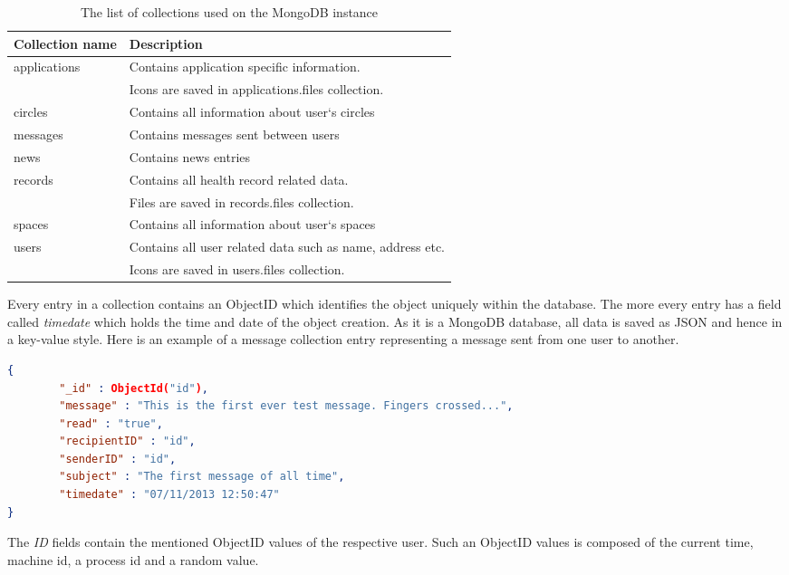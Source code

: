 \begin{table}[h]
  \centering
	\begin{tabular}{l l}
	Collection name & Description \\
	\hline
	applications & Contains application specific information. \\
	 & Icons are saved in applications.files collection.\\
	circles & Contains all information about user`s circles \\
	messages & Contains messages sent between users \\
	news & Contains news entries \\
	records & Contains all health record related data. \\
	 & Files are saved in records.files collection. \\
	spaces & Contains all information about user`s spaces \\
	users & Contains all user related data such as name, address etc. \\
	 & Icons are saved in users.files collection.\\
	\end{tabular}
	\caption{The list of collections used on the MongoDB instance}
  \label{tab:collectionTable}
\end{table}

Every entry in a collection contains an ObjectID which identifies the object uniquely within the database. The more every entry has a field called \emph{timedate} which holds the time and date of the object creation. As it is a MongoDB database, all data is saved as JSON and hence in a key-value style. Here is an example of a message collection entry representing a message sent from one user to another.\newline

\begin{lstlisting}[language=json,firstnumber=1]
{
        "_id" : ObjectId("id"),
        "message" : "This is the first ever test message. Fingers crossed...",
        "read" : "true",
        "recipientID" : "id",
        "senderID" : "id",
        "subject" : "The first message of all time",
        "timedate" : "07/11/2013 12:50:47"
}
\end{lstlisting}

The \emph{ID} fields contain the mentioned ObjectID values of the respective user. Such an ObjectID values is composed of the current time, machine id, a process id and a random value.

